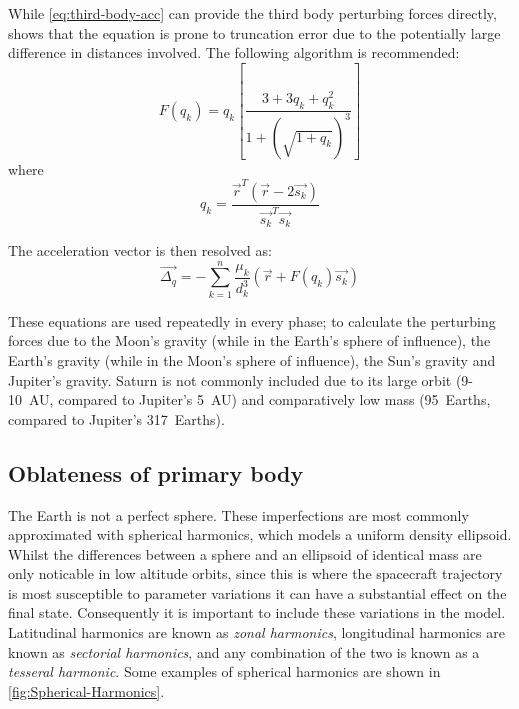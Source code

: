 While \autoref{eq:third-body-acc} can provide the third body perturbing forces directly, \textcite{Battin1999} shows that the equation is prone to truncation error due to the potentially large difference in distances involved. The following algorithm is recommended:
\begin{equation} \label{eq:Fqk}
F(q_{k}) = q_{k}\left[ \frac{3+3q_{k}+q_{k}^{2}}{1+(\sqrt{1+q_{k}})^{3}} \right] 
\end{equation} 
where
\begin{equation}
q_{k} = \frac{\vec{r}^{T}(\vec{r}-2\vec{s_{k}})}{\vec{s_{k}}^{T}\vec{s_{k}}}
\end{equation}

The acceleration vector is then resolved as:
\begin{equation}
\vec{\Delta_q} = -\sum_{k=1}^{n}\frac{\mu_{k}}{d_{k}^{3}}(\vec{r}+F(q_{k})\vec{s_{k}})
\end{equation}

These equations are used repeatedly in every phase; to calculate the perturbing forces due to the Moon's gravity (while in the Earth's sphere of influence), the Earth's gravity (while in the Moon's sphere of influence), the Sun's gravity and Jupiter's gravity. Saturn is not commonly included due to its large orbit (9-10~AU, compared to Jupiter's 5~AU) and comparatively low mass (95~Earths, compared to Jupiter's 317~Earths).



\subsection{Oblateness of primary body} \label{sub:Oblateness-of-primary-body}

The Earth is not a perfect sphere. These imperfections are most commonly approximated with spherical harmonics, which models a uniform density ellipsoid. Whilst the differences between a sphere and an ellipsoid of identical mass are only noticable in low altitude orbits, since this is where the spacecraft trajectory is most susceptible to parameter variations it can have a substantial effect on the final state. Consequently it is important to include these variations in the model. Latitudinal harmonics are known as \emph{zonal harmonics}, longitudinal harmonics are known as \emph{sectorial harmonics}, and any combination of the two is known as a \emph{tesseral harmonic}. Some examples of spherical harmonics are shown in \autoref{fig:Spherical-Harmonics}.

